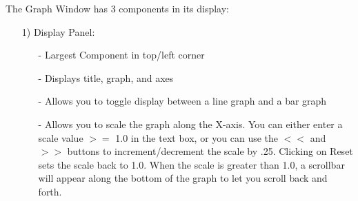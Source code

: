 \begin{enumerate}
   The Graph Window has 3 components in its display:
   \begin{enumerate}
   \item[1)]
   Display Panel:
      \begin{itemize}
      \item[-]
        Largest Component in top/left corner
      \item[-]
        Displays title, graph, and axes
      \item[-]
        Allows you to toggle display between a line graph and a bar graph
      \item[-]
        Allows you to scale the graph along the X-axis.  You can either enter
        a scale value $>=$ 1.0 in the text box, or you can use the $<<$ and $>>$
        buttons to increment/decrement the scale by .25.  Clicking on Reset
        sets the scale back to 1.0.  When the scale is greater than 1.0, a
        scrollbar will appear along the bottom of the graph to let you
        scroll back and forth.
      \end{itemize}


\end{enumerate}
\end{enumerate}
